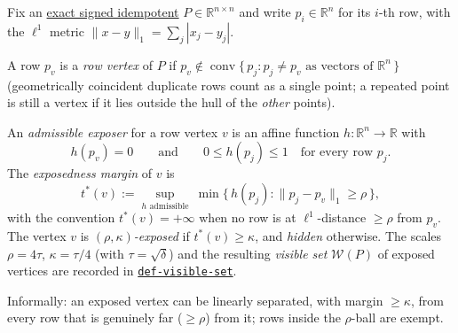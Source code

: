 \hypertarget{def:exposed}{}%
\begin{definition}\label{def:exposed}
Fix an \hyperref[def:signed-idempotent]{exact signed idempotent} $P\in\mathbb R^{n\times n}$ and
write $p_i\in\mathbb R^n$ for its $i$-th row, with the $\ell^1$ metric $\lVert x-y\rVert_1=\sum_j|x_j-y_j|$.

A row $p_v$ is a \emph{row vertex} of $P$ if $p_v\notin\operatorname{conv}\{\,p_j:p_j\neq p_v\text{ as vectors of }\mathbb R^n\,\}$
(geometrically coincident duplicate rows count as a single point; a repeated point is still a vertex if it
lies outside the hull of the \emph{other} points).

An \emph{admissible exposer} for a row vertex $v$ is an affine function $h:\mathbb R^n\to\mathbb R$ with
\[h(p_v)=0\qquad\text{and}\qquad 0\le h(p_j)\le 1\quad\text{for every row }p_j.\]
The \emph{exposedness margin} of $v$ is
\[t^*(v):=\sup_{h\text{ admissible}}\ \min\{\,h(p_j):\lVert p_j-p_v\rVert_1\ge\rho\,\},\]
with the convention $t^*(v)=+\infty$ when no row is at $\ell^1$-distance $\ge\rho$ from $p_v$. The vertex
$v$ is \emph{$(\rho,\kappa)$-exposed} if $t^*(v)\ge\kappa$, and \emph{hidden} otherwise. The scales $\rho=4\tau$,
$\kappa=\tau/4$ (with $\tau=\sqrt\delta$) and the resulting \emph{visible set} $\mathcal W(P)$ of exposed
vertices are recorded in \hyperref[def:visible-set]{\texttt{def-\allowbreak{}visible-\allowbreak{}set}}.

Informally: an exposed vertex can be linearly separated, with margin $\ge\kappa$, from every row that is
genuinely far ($\ge\rho$) from it; rows inside the $\rho$-ball are exempt.
\end{definition}
